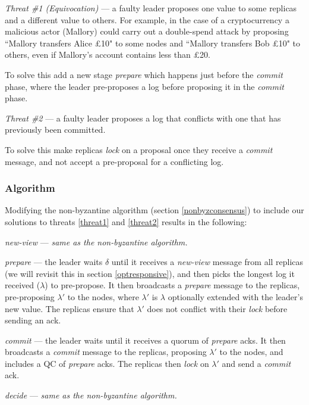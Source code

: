 \begin{description}
\item \textit{Threat \#1 (Equivocation)} --- a faulty leader proposes one value to some replicas and a different value to others. For example, in the case of a cryptocurrency a malicious actor (Mallory) could carry out a double-spend attack by proposing ``Mallory transfers Alice £10" to some nodes and ``Mallory transfers Bob £10" to others, even if Mallory's account contains less than £20. \label{threat1}

To solve this add a new stage \textit{prepare} which happens just before the \textit{commit} phase, where the leader pre-proposes a log before proposing it in the \textit{commit} phase.

\item \textit{Threat \#2} --- a faulty leader proposes a log that conflicts with one that has previously been committed. \label{threat2}

To solve this make replicas \textit{lock} on a proposal once they receive a \textit{commit} message, and not accept a pre-proposal for a conflicting log.
\end{description}

\subsubsection{Algorithm}
Modifying the non-byzantine algorithm (section \ref{nonbyzconsensus}) to include our solutions to threats \ref{threat1} and \ref{threat2} results in the following:

\begin{description}
	\item \textit{new-view} --- \textit{same as the non-byzantine algorithm.}
	\item \textit{prepare} --- the leader waits $\delta$ until it receives a \textit{new-view} message from all replicas (we will revisit this in section \ref{optresponsive}), and then picks the longest log it received ($\lambda$) to pre-propose. It then broadcasts a \textit{prepare} message to the replicas, pre-proposing $\lambda'$ to the nodes, where $\lambda'$ is $\lambda$ optionally extended with the leader's new value. The replicas ensure that $\lambda'$ does not conflict with their \textit{lock} before sending an ack.
	\item \textit{commit} --- the leader waits until it receives a quorum of \textit{prepare} acks. It then broadcasts a \textit{commit} message to the replicas, proposing $\lambda'$ to the nodes, and includes a QC of \textit{prepare} acks. The replicas then \textit{lock} on $\lambda'$ and send a \textit{commit} ack.
	\item \textit{decide} --- \textit{same as the non-byzantine algorithm.}
\end{description}

